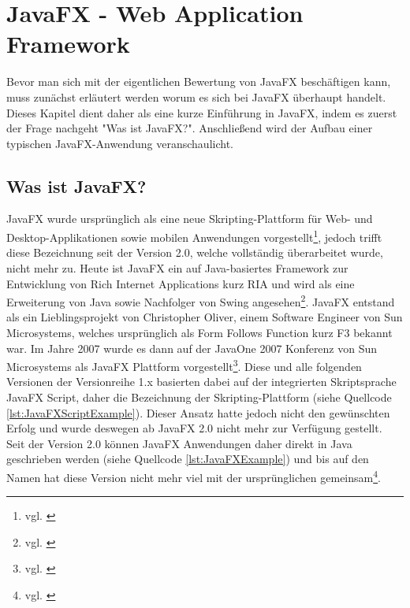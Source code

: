 

\renewcommand{\chaptertitle}{JavaFX - Web Application Framework}

\chapter{\chaptertitle} %

\label{JavaFX - Web Application Framework} %

\lhead{\chaptername{} \thechapter{} - \emph{\chaptertitle}} %

Bevor man sich mit der eigentlichen Bewertung von JavaFX beschäftigen kann, muss zunächst erläutert werden worum es sich bei JavaFX überhaupt handelt. Dieses Kapitel dient daher als eine kurze Einführung in JavaFX, indem es zuerst der Frage nachgeht "Was ist JavaFX?". Anschließend wird der Aufbau einer typischen JavaFX-Anwendung veranschaulicht.

\section{Was ist JavaFX?}

JavaFX wurde ursprünglich als eine neue Skripting-Plattform für Web- und Desktop-Applikationen sowie mobilen Anwendungen vorgestellt\footnote{vgl. \cite{einfuehrungInJavaFX}}, jedoch trifft diese Bezeichnung seit der Version 2.0, welche vollständig überarbeitet wurde, nicht mehr zu. Heute ist JavaFX ein auf Java-basiertes Framework zur Entwicklung von Rich Internet Applications kurz RIA und wird als eine Erweiterung von Java sowie Nachfolger von Swing angesehen\footnote{vgl. \cite{learnJavaFX8}}. JavaFX entstand als ein Lieblingsprojekt von Christopher Oliver, einem Software Engineer von Sun Microsystems, welches ursprünglich als Form Follows Function kurz F3 bekannt war. Im Jahre 2007 wurde es dann auf der JavaOne 2007 Konferenz von Sun Microsystems als JavaFX Plattform vorgestellt\footnote{vgl. \cite{beginningJavaFX}}. Diese und alle folgenden Versionen der Versionreihe 1.x basierten dabei auf der integrierten Skriptsprache JavaFX Script, daher die Bezeichnung der Skripting-Plattform (siehe Quellcode \ref{lst:JavaFXScriptExample}). Dieser Ansatz hatte jedoch nicht den gewünschten Erfolg und wurde deswegen ab JavaFX 2.0 nicht mehr zur Verfügung gestellt. Seit der Version 2.0 können JavaFX Anwendungen daher direkt in Java geschrieben werden (siehe Quellcode \ref{lst:JavaFXExample}) und bis auf den Namen hat diese Version nicht mehr viel mit der ursprünglichen gemeinsam\footnote{vgl. \cite{einfuehrungInJavaFX}}. \\

